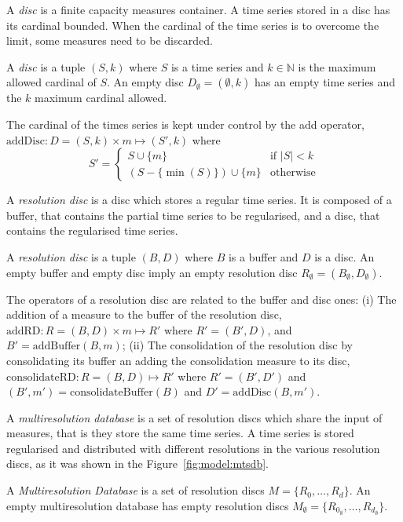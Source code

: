A \emph{disc} is a finite capacity measures container. A time series
stored in a disc has its cardinal bounded. When the cardinal of the
time series is to overcome the limit, some measures need to be
discarded.
\begin{definition}[Disc]
  A \emph{disc} is a tuple $(S,k)$ where $S$ is a time series and
  $k\in\mathbb{N}$ is the maximum allowed cardinal of $S$.  An empty
  disc $D_{\emptyset} = (\emptyset,k)$ has an empty time series and
  the $k$ maximum cardinal allowed.
\end{definition}

The cardinal of the times series is kept under control by the add
operator, $\text{addDisc}:D=(S,k)\times m\mapsto (S',k)$ where 
$$
S' = \begin{cases}
  S\cup\{m\}                 & \text{if } |S|<k  \\
  (S-\{\min(S)\}) \cup \{m\} & \text{otherwise}
\end{cases}  
$$

A \emph{resolution disc} is a disc which stores a regular time
series. It is composed of a buffer, that contains the partial time
series to be regularised, and a disc, that contains the regularised
time series.
\begin{definition}
  A \emph{resolution disc} is a tuple $(B,D)$ where $B$ is a buffer
  and $D$ is a disc.  An empty buffer and empty disc imply an empty
  resolution disc $R_{\emptyset} = (B_{\emptyset},D_{\emptyset})$.
\end{definition}
 
The operators of a resolution disc are related to the buffer and disc
ones: (i) The addition of a measure to the buffer of the resolution
disc, $\text{addRD}:R=(B,D) \times m \mapsto R'$ where $R'= (B',D)$,
and $B'= \text{addBuffer}(B,m)$; (ii) The consolidation of the
resolution disc by consolidating its buffer an adding the
consolidation measure to its disc, $\text{consolidateRD}:R=(B,D)
\mapsto R'$ where $R'= (B',D')$ and $(B',m') =
\text{consolidateBuffer}(B)$ and $D'= \text{addDisc}(B,m')$.

A \emph{multiresolution database} is a set of resolution discs which
share the input of measures, that is they store the same time
series. A time series is stored regularised and distributed with
different resolutions in the various resolution discs, as it was shown
in the Figure~\ref{fig:model:mtsdb}.
\begin{definition}
  A \emph{Multi\-re\-solution Database} is a set of resolution discs
  $M=\{R_0, \dots, R_d\}$.  An empty multiresolution database has
  empty resolution discs $M_{\emptyset}=\{R_{0_\emptyset}, \dots,
  R_{d_\emptyset}\}$.
\end{definition}

